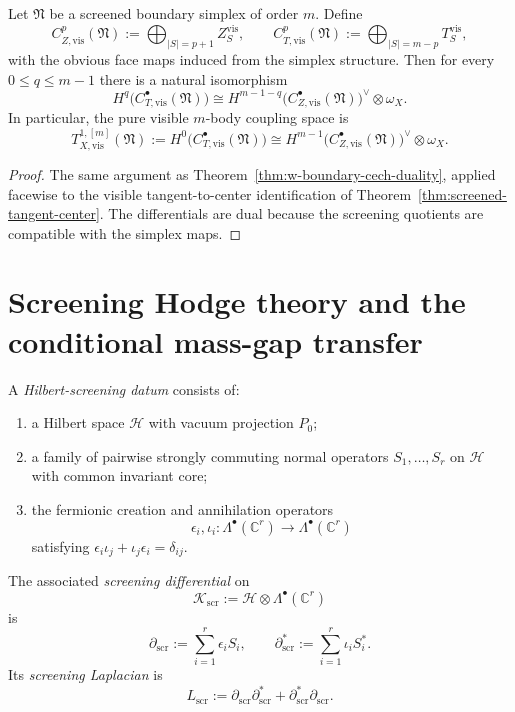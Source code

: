 \begin{theorem}
\label{thm:screened-cech-duality}
Let $\mathfrak N$ be a screened boundary simplex of order $m$.
Define
\[
C_{Z,\mathrm{vis}}^p(\mathfrak N):=\bigoplus_{|S|=p+1} Z_S^{\mathrm{vis}},
\qquad
C_{T,\mathrm{vis}}^p(\mathfrak N):=\bigoplus_{|S|=m-p} T_S^{\mathrm{vis}},
\]
with the obvious face maps induced from the simplex structure.
Then for every $0\le q\le m-1$ there is a natural isomorphism
\[
H^q\bigl(C_{T,\mathrm{vis}}^{\bullet}(\mathfrak N)\bigr)
\cong
H^{m-1-q}\bigl(C_{Z,\mathrm{vis}}^{\bullet}(\mathfrak N)\bigr)^{\vee}\otimes \omega_X.
\]
In particular, the pure visible $m$-body coupling space is
\[
T_{X,\mathrm{vis}}^{1,[m]}(\mathfrak N)
:=H^0\bigl(C_{T,\mathrm{vis}}^{\bullet}(\mathfrak N)\bigr)
\cong
H^{m-1}\bigl(C_{Z,\mathrm{vis}}^{\bullet}(\mathfrak N)\bigr)^{\vee}\otimes \omega_X.
\]
\end{theorem}

\begin{proof}
The same argument as Theorem~\ref{thm:w-boundary-cech-duality}, applied
facewise to the visible tangent-to-center identification of Theorem~\ref{thm:screened-tangent-center}.
The differentials are dual because the screening quotients are compatible with the simplex maps.
\end{proof}


\section{Screening Hodge theory and the conditional mass-gap transfer}
\label{sec:screening-hodge-mass-gap}

\begin{definition}
\label{def:hilbert-screening-datum}
A \emph{Hilbert-screening datum} consists of:
\begin{enumerate}[label=(\roman*)]
\item a Hilbert space $\mathcal H$ with vacuum projection $P_0$;
\item a family of pairwise strongly commuting normal operators $S_1,\dots,S_r$ on $\mathcal H$ with common invariant core;
\item the fermionic creation and annihilation operators
\[
\epsilon_i,\iota_i\colon \Lambda^{\bullet}(\mathbb C^r)\to \Lambda^{\bullet}(\mathbb C^r)
\]
satisfying $\epsilon_i\iota_j+\iota_j\epsilon_i=\delta_{ij}$.
\end{enumerate}
The associated \emph{screening differential} on
\[
\mathcal K_{\mathrm{scr}}:=\mathcal H\otimes \Lambda^{\bullet}(\mathbb C^r)
\]
is
\[
\partial_{\mathrm{scr}}:=\sum_{i=1}^r \epsilon_i S_i,
\qquad
\partial_{\mathrm{scr}}^*:=\sum_{i=1}^r \iota_i S_i^*.
\]
Its \emph{screening Laplacian} is
\[
L_{\mathrm{scr}}:=\partial_{\mathrm{scr}}\partial_{\mathrm{scr}}^*+\partial_{\mathrm{scr}}^*\partial_{\mathrm{scr}}.
\]
\end{definition}

